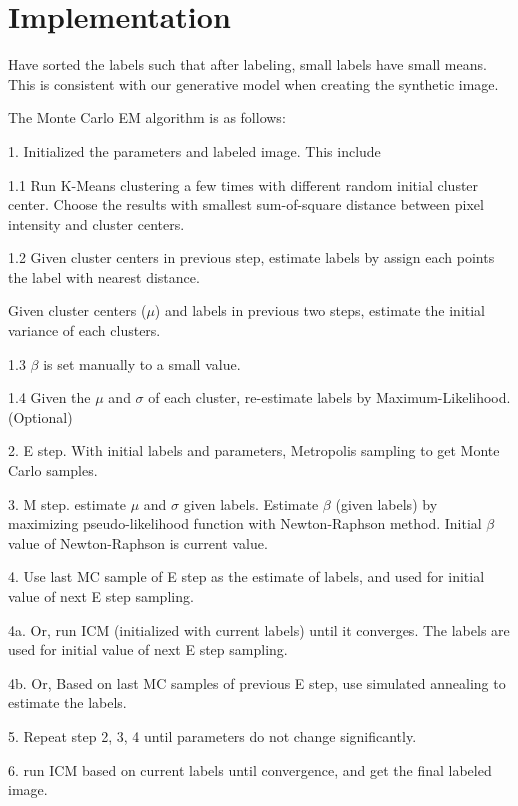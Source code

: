 \documentclass[12pt]{article}
\begin{document}
\section{Implementation}
Have sorted the labels such that after labeling, small labels have small means. This is consistent with our generative model when creating the synthetic image.

The Monte Carlo EM algorithm is as follows:
\begin{itemize*}
  
\item[1.] Initialized the parameters and labeled image. This
  include
  \begin{itemize*}
  \item [1.1]Run K-Means clustering a few times with different random
    initial cluster center. Choose the results with smallest
    sum-of-square distance between pixel intensity and cluster
    centers.
  \item[1.2] Given cluster centers in previous step, estimate labels by
    assign each points the label with nearest distance.
  \item Given cluster centers ($\mu$) and labels in previous two
    steps, estimate the initial variance of each clusters.
  \item[1.3] $\beta$ is set manually to a small value.
  \item[1.4] Given the $\mu$ and $\sigma$ of each cluster, re-estimate
    labels by Maximum-Likelihood. (Optional)
  \end{itemize*}
\item[2.] E step. With initial labels and parameters, Metropolis
  sampling to get Monte Carlo samples.
\item[3.] M step. estimate $\mu$ and $\sigma$ given labels. Estimate
  $\beta$ (given labels) by maximizing pseudo-likelihood function with
  Newton-Raphson method. Initial $\beta$ value of Newton-Raphson is
  current value.
\item [4.] Use last MC sample of E step as the estimate
  of labels, and used for initial value of next E step sampling.
\item [4a.]  Or, run ICM (initialized with current labels) until it
  converges. The labels are used for initial value of next E step
  sampling.
\item [4b.] Or, Based on last MC samples of previous E step, use
  simulated annealing to estimate the labels.
\item [5.]Repeat step 2, 3, 4 until parameters do not change
  significantly.
\item [6.] run ICM based on current labels until convergence, and get
  the final labeled image.
      
\end{itemize*}
\end{document}
